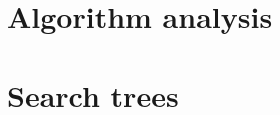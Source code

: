 \documentclass[moon, nosides, colormath]{lecturenotes}
\begin{document}
    \section{Algorithm analysis}
    

    \section{Search trees}
    
\end{document}
